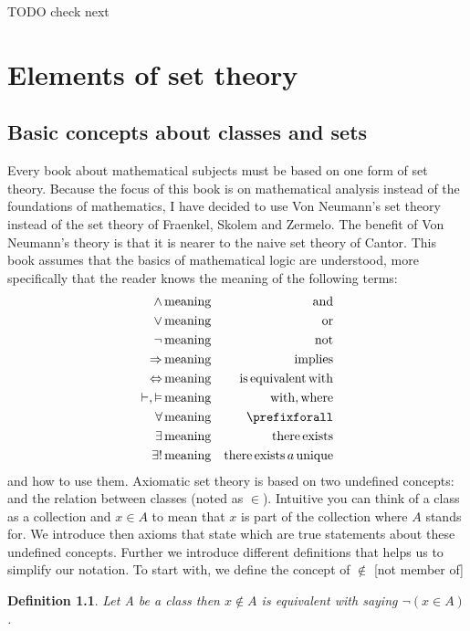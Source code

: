 \documentclass{book}
\newcommand{\nin}{\not\in}
\newcommand{\tmop}[1]{\ensuremath{\operatorname{#1}}}
\newcommand{\tmtextbf}[1]{\text{{\bfseries{#1}}}}
\newtheorem{definition}{Definition}
{\theorembodyfont{\rmfamily}\newtheorem{example}{Example}}
\begin{document}
TODO check next\chapter{Elements of set theory}

\section{Basic concepts about classes and sets}

Every book about mathematical subjects must be based on one form of set
theory. Because the focus of this book is on mathematical analysis instead of
the foundations of mathematics, I have decided to use Von Neumann's set theory
instead of the set theory of Fraenkel, Skolem and Zermelo. The benefit of Von
Neumann's theory is that it is nearer to the naive set theory of Cantor. This
book assumes that the basics of mathematical logic are understood, more
specifically that the reader knows the meaning of the following terms:
\begin{eqnarray*}
  \wedge & \tmop{meaning} & \tmop{and}\\
  \vee & \tmop{meaning} & \tmop{or}\\
  \neg & \tmop{meaning} & \tmop{not}\\
  \Rightarrow & \tmop{meaning} & \tmop{implies}\\
  \Leftrightarrow & \tmop{meaning} & \tmop{is} \tmop{equivalent} \tmop{with}\\
  \vdash, \vDash & \tmop{meaning} & \tmop{with}, \tmop{where}\\
  \forall & \tmop{meaning} & \prefixforall\\
  \exists & \tmop{meaning} & \tmop{there} \tmop{exists}\\
  \exists ! & \tmop{meaning} & \tmop{there} \tmop{exists} a \tmop{unique}
\end{eqnarray*}
and how to use them. Axiomatic set theory is based on two undefined concepts:
\tmtextbf{class} and the \tmtextbf{membership} relation between classes (noted
as $\in$). Intuitive you can think of a class as a collection and $x \in A$ to
mean that $x$ is part of the collection where $A$ stands for. We introduce
then axioms that state which are true statements about these undefined
concepts. Further we introduce different definitions that helps us to simplify
our notation. To start with, we define the concept of $\nin$ [not member of]

\begin{definition}
  Let A be a class then $x \nin A$ is equivalent with saying $\neg (x \in A)$.
  
\end{definition}
\end{document}
